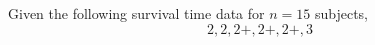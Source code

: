 \documentclass[12pt]{article}
\begin{document}
Given the following survival time data for $n = 15$ subjects,
$$
2, 2, 2+, 2+, 2+, 3
$$
\end{document}
